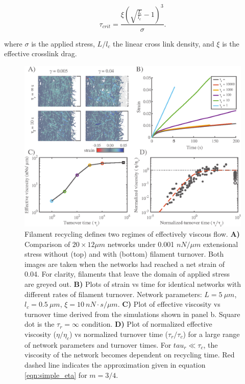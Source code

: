 \begin{equation}
	\label{eqn:syst3}
	\tau_{crit} = \frac{\xi {\left (\sqrt{\frac{L}{l_c}}-1 \right )}^3}{\sigma}.
\end{equation}

where  $\sigma$ is the applied stress, $L/l_c$ the linear cross link density, and $\xi$ is the effective crosslink drag. 


\begin{figure}[h!]
	\centering
	\includegraphics[width=\hsize]{active/figures/Fig4}
	\caption{\label{fig:passive_rec}  Filament recycling defines two regimes of effectively viscous flow. \textbf{A)} Comparison of $20 \times 12 \mu m$ networks under 0.001 $nN/\mu m$ extensional stress without (top) and with (bottom) filament turnover.  Both images are taken when the networks had reached a net strain of 0.04.  For clarity, filaments that leave the domain of applied stress are greyed out. \textbf{B)} Plots of strain vs time for identical networks with different rates of filament turnover.  Network parameters: $L=5\: \mu m$, $l_c=0.5\: \mu m$, $\xi=10\: nN\cdot s/\mu m$. \textbf{C)}  Plot of effective viscosity vs turnover time derived from the simulations shown in panel b.  Square dot is the $\tau_r=\infty$ condition.  \textbf{D)} Plot of normalized effective viscosity ($\eta/\eta_c$) vs normalized turnover time ($\tau_r/\tau_c$) for a large range of network parameters and turnover times. For $tau_r \ll \tau_c$, the viscosity of the network becomes dependent on recycling time. Red dashed line indicates the approximation given in equation \ref{eqn:simple_eta} for $m=3/4$.}
\end{figure}

